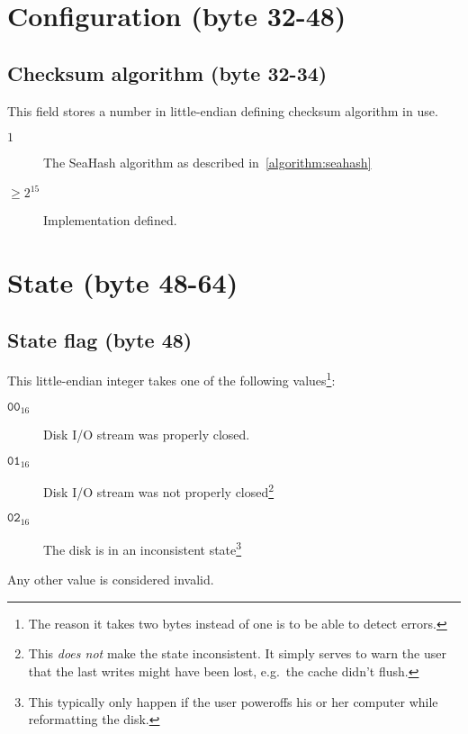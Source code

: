 \documentclass[11pt,a4paper]{report}
\begin{document}
    \section{Configuration (byte 32-48)}
        \subsection{Checksum algorithm (byte 32-34)}
        \label{config:checksum}
        This field stores a number in little-endian defining checksum algorithm
        in use.

        \begin{description}
            \item [$1$] The SeaHash algorithm as described
                in~\ref{algorithm:seahash}
            \item [$\geq 2^{15}$] Implementation defined.
        \end{description}

    \section{State (byte 48-64)}
        \subsection{State flag (byte 48)}
        \label{header:consistency}
        This little-endian integer takes one of the following
        values\footnote{The reason it takes two bytes instead of one is to be
        able to detect errors.}:

        \begin{description}
            \item [$\texttt{00}_{16}$] Disk I/O stream was properly closed.
            \item [$\texttt{01}_{16}$] Disk I/O stream was not properly
                closed\footnote{This \emph{does not} make the state
                inconsistent. It simply serves to warn the user that the last
                writes might have been lost, e.g.\ the cache didn't flush.}
            \item [$\texttt{02}_{16}$] The disk is in an inconsistent
                state\footnote{This typically only happen if the user poweroffs
                his or her computer while reformatting the disk.}
        \end{description}

        Any other value is considered invalid.
\end{document}
